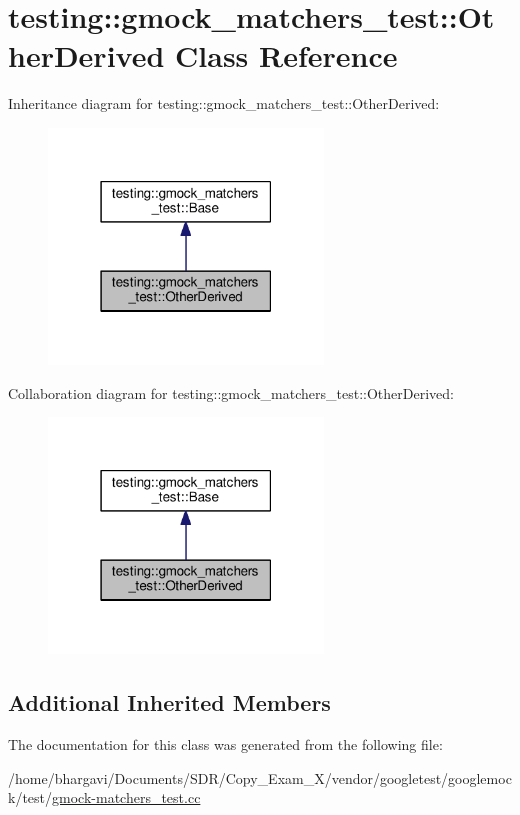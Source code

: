 \hypertarget{classtesting_1_1gmock__matchers__test_1_1_other_derived}{}\section{testing\+:\+:gmock\+\_\+matchers\+\_\+test\+:\+:Other\+Derived Class Reference}
\label{classtesting_1_1gmock__matchers__test_1_1_other_derived}


Inheritance diagram for testing\+:\+:gmock\+\_\+matchers\+\_\+test\+:\+:Other\+Derived\+:
\nopagebreak
\begin{figure}[H]
\begin{center}
\leavevmode
\includegraphics[width=207pt]{classtesting_1_1gmock__matchers__test_1_1_other_derived__inherit__graph}
\end{center}
\end{figure}


Collaboration diagram for testing\+:\+:gmock\+\_\+matchers\+\_\+test\+:\+:Other\+Derived\+:
\nopagebreak
\begin{figure}[H]
\begin{center}
\leavevmode
\includegraphics[width=207pt]{classtesting_1_1gmock__matchers__test_1_1_other_derived__coll__graph}
\end{center}
\end{figure}
\subsection*{Additional Inherited Members}


The documentation for this class was generated from the following file\+:\begin{DoxyCompactItemize}
\item 
/home/bhargavi/\+Documents/\+S\+D\+R/\+Copy\+\_\+\+Exam\+\_\+X/vendor/googletest/googlemock/test/\hyperlink{gmock-matchers__test_8cc}{gmock-\/matchers\+\_\+test.\+cc}\end{DoxyCompactItemize}
